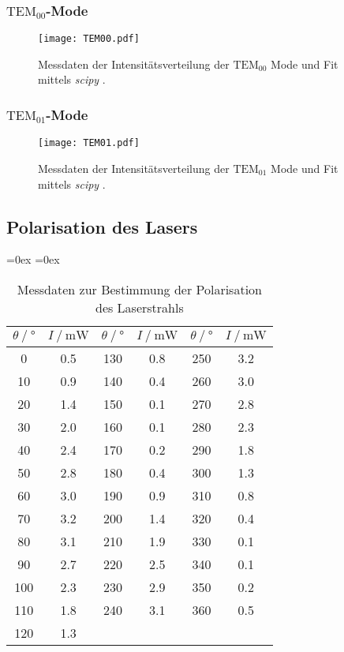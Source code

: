 \subsubsection{$\text{TEM}_00$-Mode}

\begin{figure}
  \centering
  \texttt{[image: TEM00.pdf]}
  \caption{Messdaten der Intensitätsverteilung der $\text{TEM}_00$ Mode und Fit mittels \textit{scipy} \cite{scipy}.}
  \label{fig:TEM00}
\end{figure}

\subsubsection{$\text{TEM}_01$-Mode}

\begin{figure}
  \centering
  \texttt{[image: TEM01.pdf]}
  \caption{Messdaten der Intensitätsverteilung der $\text{TEM}_01$ Mode und Fit mittels \textit{scipy} \cite{scipy}.}
  \label{fig:TEM01}
\end{figure}

\subsection{Polarisation des Lasers}

\begin{table}
  \centering
  \aboverulesep=0ex %
  \belowrulesep=0ex %
  \caption{Messdaten zur Bestimmung der Polarisation des Laserstrahls}
  \label{tab:polarisation}
  \begin{tabular}{S[table-format = 3.0] S[table-format = 1.1] | S[table-format = 3.0] S[table-format = 1.1] | S[table-format = 3.0] S[table-format = 1.1]}
    {$\theta \mathbin{/} \unit{\degree}$} & {$I \mathbin{/} \unit{\milli\watt}$} & {$\theta \mathbin{/} \unit{\degree}$} & {$I \mathbin{/} \unit{\milli\watt}$} &%
    {$\theta \mathbin{/} \unit{\degree}$} & {$I \mathbin{/} \unit{\milli\watt}$} \\
    \midrule
    \rule{0pt}{1.1EM}
      0 & 0.5 & 130 & 0.8 & 250 & 3.2 \\
     10 & 0.9 & 140 & 0.4 & 260 & 3.0 \\
     20 & 1.4 & 150 & 0.1 & 270 & 2.8 \\
     30 & 2.0 & 160 & 0.1 & 280 & 2.3 \\
     40 & 2.4 & 170 & 0.2 & 290 & 1.8 \\
     50 & 2.8 & 180 & 0.4 & 300 & 1.3 \\
     60 & 3.0 & 190 & 0.9 & 310 & 0.8 \\
     70 & 3.2 & 200 & 1.4 & 320 & 0.4 \\
     80 & 3.1 & 210 & 1.9 & 330 & 0.1 \\
     90 & 2.7 & 220 & 2.5 & 340 & 0.1 \\
    100 & 2.3 & 230 & 2.9 & 350 & 0.2 \\
    110 & 1.8 & 240 & 3.1 & 360 & 0.5 \\
    120 & 1.3 &     &     &     &     \\
  \end{tabular}
\end{table}

